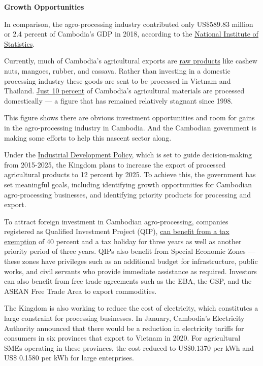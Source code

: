 \documentclass[10pt,a4paper]{letter}
\begin{document}
\textbf{Growth Opportunities}

In comparison, the agro-processing industry contributed only US\$589.83 million or 2.4 percent of Cambodia's GDP in 2018, according to the \href{https://www.nis.gov.kh/nis/NA/NA2018_Tab_files/TAB1-2.htm}{National Institute of Statistics}.

Currently, much of Cambodia's agricultural exports are \href{https://www.netherlandsworldwide.nl/binaries/en-nederlandwereldwijd/documents/publications/2018/10/04/agriculture-in-cambodia/Agriculture+in+Cambodia.pdf}{raw products} like cashew nuts, mangoes, rubber, and cassava. Rather than investing in a domestic processing industry these goods are sent to be processed in Vietnam and Thailand. \href{http://www.mih.gov.kh/File/UploadedFiles/12_9_2016_4_29_43.pdf}{Just 10 percent} of Cambodia's agricultural materials are processed domestically --- a figure that has remained relatively stagnant since 1998.

This figure shows there are obvious investment opportunities and room for gains in the agro-processing industry in Cambodia. And the Cambodian government is making some efforts to help this nascent sector along. 

Under the \href{http://www.mih.gov.kh/File/UploadedFiles/12_9_2016_4_29_43.pdf}{Industrial Development Policy}, which is set to guide decision-making from 2015-2025, the Kingdom plans to increase the export of processed agricultural products to 12 percent by 2025. To achieve this, the government has set meaningful goals, including identifying growth opportunities for Cambodian agro-processing businesses, and identifying priority products for processing and export.  

To attract foreign investment in Cambodian agro-processing, companies registered as Qualified Investment Project (QIP), \href{https://southeastasiaglobe.com/5-reasons-cambodia-is-best-in-the-region-for-foreign-investments/}{can benefit from a tax exemption} of 40 percent and a tax holiday for three years as well as another priority period of three years. QIPs also benefit from Special Economic Zones --- these zones have privileges such as an additional budget for infrastructure, public works, and civil servants who provide immediate assistance as required. Investors can also benefit from free trade agreements such as the EBA, the GSP, and the ASEAN Free Trade Area to export commodities. 

The Kingdom is also working to reduce the cost of electricity, which constitutes a large constraint for processing businesses. In January, Cambodia's Electricity Authority announced that there would be a reduction in electricity tariffs for consumers in six provinces that export to Vietnam in 2020. For agricultural SMEs operating in these provinces, the cost reduced to US\$0.1370 per kWh and US\$ 0.1580 per kWh for large enterprises.
\end{document}
